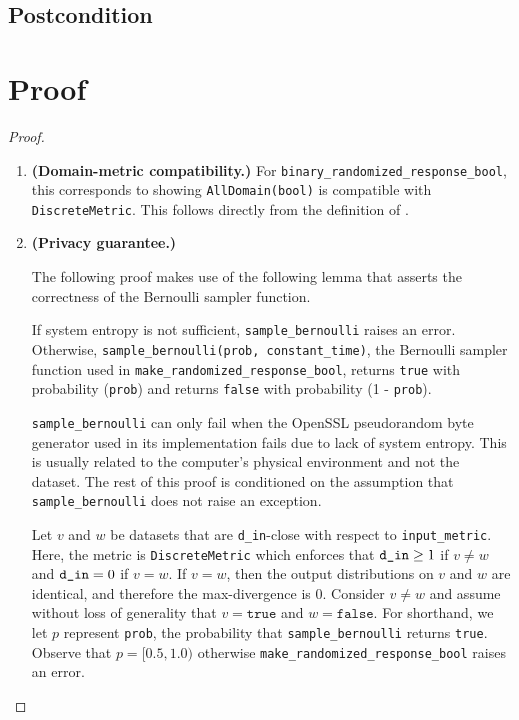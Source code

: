 \documentclass{article}
\begin{document}
\subsection*{Postcondition}


\section{Proof}

\begin{proof} 
\hfill
\begin{enumerate}
    \item \textbf{(Domain-metric compatibility.)} For \texttt{binary\_randomized\_response\_bool}, this corresponds to showing \texttt{AllDomain(bool)} is compatible with \texttt{DiscreteMetric}. 
    This follows directly from the definition of .
    
    \item \textbf{(Privacy guarantee.)} 
    
    \begin{tcolorbox}
\begin{note}
The following proof makes use of the following lemma that asserts the correctness of the Bernoulli sampler function.
    \begin{lemma}
    If system entropy is not sufficient, \texttt{sample\_bernoulli} raises an error. 
    Otherwise, \texttt{sample\_bernoulli(prob, constant\_time)}, the Bernoulli sampler function used in \texttt{make\_randomized\_response\_bool}, 
    returns \texttt{true} with probability (\texttt{prob}) and returns  \texttt{false} with probability (1 - \texttt{prob}).
    \end{lemma}
\end{note}
\end{tcolorbox}

    \texttt{sample\_bernoulli} can only fail when the OpenSSL pseudorandom byte generator used in its implementation fails due to lack of system entropy. 
    This is usually related to the computer's physical environment and not the dataset. 
    The rest of this proof is conditioned on the assumption that \texttt{sample\_bernoulli} does not raise an exception. 
    
    Let $v$ and $w$ be datasets that are \texttt{d\_in}-close with respect to \texttt{input\_metric}.
    Here, the metric is \texttt{DiscreteMetric} which enforces that $\texttt{d\_in} \geq 1$ if $v \ne w$ and $\texttt{d\_in} = 0$ if $v = w$. 
    If $v = w$, then the output distributions on $v$ and $w$ are identical, and therefore the max-divergence is 0.
    Consider $v \ne w$ and assume without loss of generality that $v = \texttt{true}$ and $w = \texttt{false}$. 
    For shorthand, we let $p$ represent \texttt{prob}, the probability that \texttt{sample\_bernoulli} returns \texttt{true}. 
    Observe that $p = [0.5, 1.0)$ otherwise \texttt{make\_randomized\_response\_bool} raises an error. 
    

\end{enumerate}
\end{proof}
\end{document}
